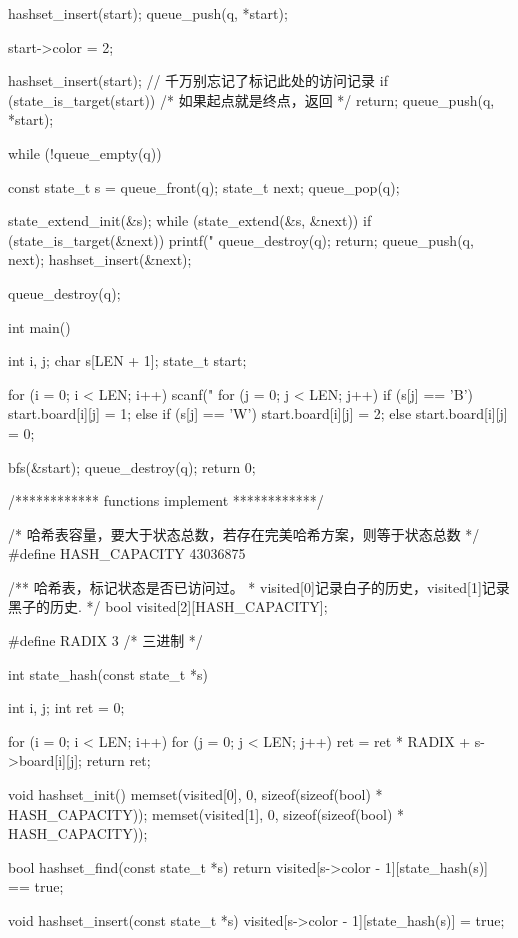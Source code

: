 \begin{Codex}[label=four_adjacent.c]
{    hashset_insert(start);
    queue_push(q, *start);

    start->color = 2;

    hashset_insert(start); // 千万别忘记了标记此处的访问记录
    if (state_is_target(start)) /* 如果起点就是终点，返回 */
        return;
    queue_push(q, *start);

    while (!queue_empty(q)) {
        const state_t s = queue_front(q);
        state_t next;
        queue_pop(q);

        state_extend_init(&s);
        while (state_extend(&s, &next)) {
            if (state_is_target(&next)) {
                printf("%
                queue_destroy(q);
                return;
            }
            queue_push(q, next);
            hashset_insert(&next);
        }
    }
    queue_destroy(q);
}

int main() {
    int i, j;
    char s[LEN + 1];
    state_t start;

    for (i = 0; i < LEN; i++) {
        scanf("%
        for (j = 0; j < LEN; j++) {
            if (s[j] == 'B') start.board[i][j] = 1;
            else if (s[j] == 'W') start.board[i][j] = 2;
            else start.board[i][j] = 0;
        }
    }

    bfs(&start);
    queue_destroy(q);
    return 0;
}

/************ functions implement ************/

/* 哈希表容量，要大于状态总数，若存在完美哈希方案，则等于状态总数 */
#define HASH_CAPACITY 43036875

/** 哈希表，标记状态是否已访问过。
 * visited[0]记录白子的历史，visited[1]记录黑子的历史.
 */
bool visited[2][HASH_CAPACITY];

#define RADIX 3 /* 三进制 */

int state_hash(const state_t *s) {
    int i, j;
    int ret = 0;

    for (i = 0; i < LEN; i++) {
        for (j = 0; j < LEN; j++) {
            ret = ret * RADIX + s->board[i][j];
        }
    }
    return ret;
}

void hashset_init() {
    memset(visited[0], 0, sizeof(sizeof(bool) * HASH_CAPACITY));
    memset(visited[1], 0, sizeof(sizeof(bool) * HASH_CAPACITY));
}

bool hashset_find(const state_t *s) {
    return visited[s->color - 1][state_hash(s)] == true;
}

void hashset_insert(const state_t *s) {
    visited[s->color - 1][state_hash(s)] = true;
}


\end{Codex}
